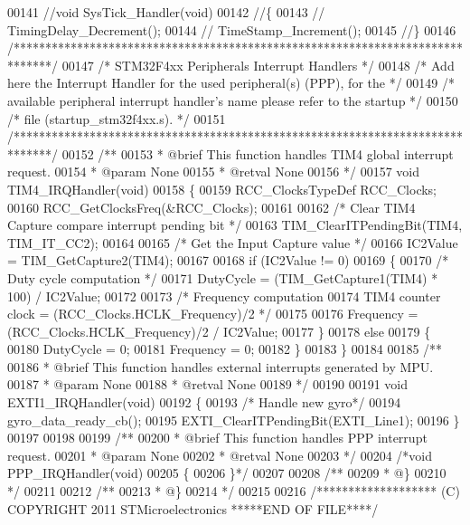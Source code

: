 \begin{DoxyCode}
00141 \textcolor{comment}{//void SysTick\_Handler(void)}
00142 \textcolor{comment}{//\{}
00143 \textcolor{comment}{//    TimingDelay\_Decrement();}
00144 \textcolor{comment}{//    TimeStamp\_Increment();}
00145 \textcolor{comment}{//\}}
00146 \textcolor{comment}{/******************************************************************************/}
00147 \textcolor{comment}{/*                 STM32F4xx Peripherals Interrupt Handlers                   */}
00148 \textcolor{comment}{/*  Add here the Interrupt Handler for the used peripheral(s) (PPP), for the  */}
00149 \textcolor{comment}{/*  available peripheral interrupt handler's name please refer to the startup */}
00150 \textcolor{comment}{/*  file (startup\_stm32f4xx.s).                                               */}
00151 \textcolor{comment}{/******************************************************************************/}
00152 \textcolor{comment}{/**}
00153 \textcolor{comment}{  * @brief  This function handles TIM4 global interrupt request.}
00154 \textcolor{comment}{  * @param  None}
00155 \textcolor{comment}{  * @retval None}
00156 \textcolor{comment}{  */}
00157 \textcolor{keywordtype}{void} TIM4_IRQHandler(\textcolor{keywordtype}{void})
00158 \{
00159   RCC\_ClocksTypeDef RCC\_Clocks;
00160   RCC_GetClocksFreq(&RCC\_Clocks);
00161 
00162   \textcolor{comment}{/* Clear TIM4 Capture compare interrupt pending bit */}
00163   TIM_ClearITPendingBit(TIM4, TIM_IT_CC2);
00164 
00165   \textcolor{comment}{/* Get the Input Capture value */}
00166   IC2Value = TIM\_GetCapture2(TIM4);
00167 
00168   \textcolor{keywordflow}{if} (IC2Value != 0)
00169   \{
00170     \textcolor{comment}{/* Duty cycle computation */}
00171     DutyCycle = (TIM\_GetCapture1(TIM4) * 100) / IC2Value;
00172 
00173     \textcolor{comment}{/* Frequency computation }
00174 \textcolor{comment}{       TIM4 counter clock = (RCC\_Clocks.HCLK\_Frequency)/2 */}
00175 
00176     Frequency = (RCC\_Clocks.HCLK\_Frequency)/2 / IC2Value;
00177   \}
00178   \textcolor{keywordflow}{else}
00179   \{
00180     DutyCycle = 0;
00181     Frequency = 0;
00182   \}
00183 \}
00184 
00185 \textcolor{comment}{/**}
00186 \textcolor{comment}{  * @brief  This function handles external interrupts generated by MPU.}
00187 \textcolor{comment}{  * @param  None}
00188 \textcolor{comment}{  * @retval None}
00189 \textcolor{comment}{  */}
00190 
00191 \textcolor{keywordtype}{void} EXTI1_IRQHandler(\textcolor{keywordtype}{void})
00192 \{
00193   \textcolor{comment}{/* Handle new gyro*/}
00194   gyro_data_ready_cb();
00195   EXTI_ClearITPendingBit(EXTI_Line1);
00196 \}
00197 
00198 
00199 \textcolor{comment}{/**}
00200 \textcolor{comment}{  * @brief  This function handles PPP interrupt request.}
00201 \textcolor{comment}{  * @param  None}
00202 \textcolor{comment}{  * @retval None}
00203 \textcolor{comment}{  */}
00204 \textcolor{comment}{/*void PPP\_IRQHandler(void)}
00205 \textcolor{comment}{\{}
00206 \textcolor{comment}{\}*/}
00207 
00208 \textcolor{comment}{/**}
00209 \textcolor{comment}{  * @\}}
00210 \textcolor{comment}{  */}
00211 
00212 \textcolor{comment}{/**}
00213 \textcolor{comment}{  * @\}}
00214 \textcolor{comment}{  */}
00215 
00216 \textcolor{comment}{/******************* (C) COPYRIGHT 2011 STMicroelectronics *****END OF FILE****/}
\end{DoxyCode}
